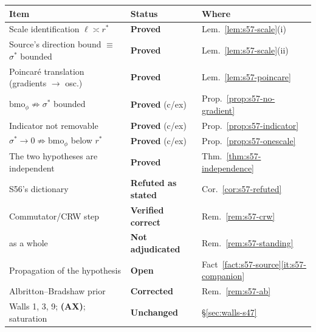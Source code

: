 \documentclass[11pt]{article}
\theoremstyle{definition}
\theoremstyle{remark}
\begin{document}
\begin{center}
\begin{tabular}{lll}
\hline
Item & Status & Where \\
\hline
Scale identification $\ell\asymp r^*$
  & \textbf{Proved} & Lem.~\ref{lem:s57-scale}(i) \\
Source's direction bound $\equiv$ $\sigma^*$ bounded
  & \textbf{Proved} & Lem.~\ref{lem:s57-scale}(ii) \\
Poincar\'e translation (gradients $\to$ osc.)
  & \textbf{Proved} & Lem.~\ref{lem:s57-poincare} \\
$\mathrm{bmo}_\phi\not\Rightarrow\sigma^*$ bounded
  & \textbf{Proved} (c/ex) & Prop.~\ref{prop:s57-no-gradient} \\
Indicator not removable
  & \textbf{Proved} (c/ex) & Prop.~\ref{prop:s57-indicator} \\
$\sigma^*\to0\not\Rightarrow\mathrm{bmo}_\phi$ below $r^*$
  & \textbf{Proved} (c/ex) & Prop.~\ref{prop:s57-onescale} \\
The two hypotheses are independent
  & \textbf{Proved} & Thm.~\ref{thm:s57-independence} \\
S56's dictionary
  & \textbf{Refuted as stated} & Cor.~\ref{cor:s57-refuted} \\
Commutator/CRW step
  & \textbf{Verified correct} & Rem.~\ref{rem:s57-crw} \\
\cite[Thm.~7.4]{Grujic2026Log} as a whole
  & \textbf{Not adjudicated} & Rem.~\ref{rem:s57-standing} \\
Propagation of the hypothesis
  & \textbf{Open} & Fact~\ref{fact:s57-source}\ref{it:s57-companion} \\
Albritton--Bradshaw prior
  & \textbf{Corrected} & Rem.~\ref{rem:s57-ab} \\
Walls 1, 3, 9; \textbf{(AX)}; saturation
  & \textbf{Unchanged} & \S\ref{sec:walls-s47} \\
\hline
\end{tabular}
\end{center}
\end{document}
